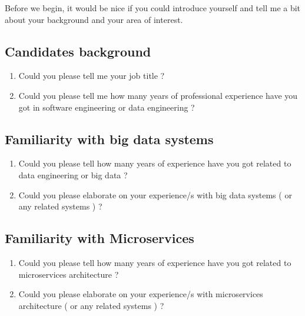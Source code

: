\documentclass{bmcart}
\begin{document}
\begin{backmatter}
Before we begin, it would be nice if you could introduce yourself and tell me a bit about your background and your area of interest. 

\subsection*{\textbf{Candidates background}}

\begin{enumerate}
    \item Could you please tell me your job title ? 
    \item Could you please tell me how many years of professional experience have you got in software engineering or data engineering ? 
\end{enumerate}

\subsection*{\textbf{Familiarity with big data systems}}

\begin{enumerate}
    \item Could you please tell how many years of experience have you got related to data engineering or big data ?
    \item Could you please elaborate on your experience/s with big data systems ( or any related systems ) ? 
\end{enumerate}


\subsection*{\textbf{Familiarity with Microservices}}

\begin{enumerate}
    \item Could you please tell how many years of experience have you got related to microservices architecture ?
    \item Could you please elaborate on your experience/s with microservices architecture ( or any related systems ) ?
\end{enumerate}



\end{backmatter}
\end{document}
